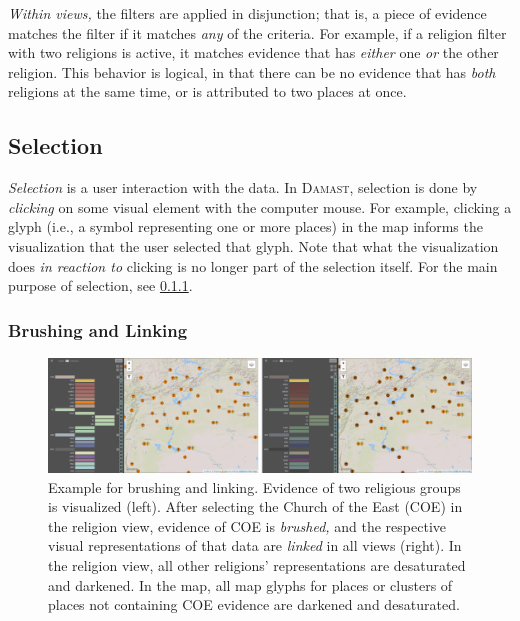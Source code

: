 \emph{Within views,} the filters are applied in disjunction; that is, a piece of evidence matches the filter if it matches \emph{any} of the criteria.
For example, if a religion filter with two religions is active, it matches evidence that has \emph{either} one \emph{or} the other religion.
This behavior is logical, in that there can be no evidence that has \emph{both} religions at the same time, or is attributed to two places at once.

\subsection{Selection}
\label{sec:terminology-selection}

\emph{Selection} is a user interaction with the data.
In \textsc{Damast}, selection is done by \emph{clicking} on some visual element with the computer mouse.
For example, clicking a glyph (i.e., a symbol representing one or more places) in the map informs the visualization that the user selected that glyph.
Note that what the visualization does \emph{in reaction to} clicking is no longer part of the selection itself.
For the main purpose of selection, see \cref{sec:terminology-brushing-linking}.

\subsubsection{Brushing and Linking}
\label{sec:terminology-brushing-linking}

\begin{figure}[tb]
  \centering
  \includegraphics[width=\textwidth]{../src/assets/visualization-documentation/brushing-linking-horizontal.png}
  \caption{
    Example for brushing and linking.
    Evidence of two religious groups is visualized (left).
    After selecting the Church of the East (COE) in the religion view, evidence of COE is \emph{brushed,} and the respective visual representations of that data are \emph{linked} in all views (right).
    In the religion view, all other religions' representations are desaturated and darkened.
    In the map, all map glyphs for places or clusters of places not containing COE evidence are darkened and desaturated.
  }
  \label{fig:brushing-linking}
\end{figure}


